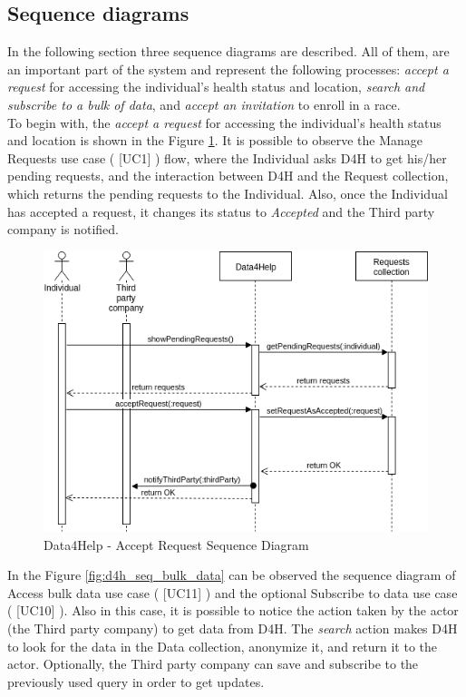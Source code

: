\documentclass[a4paper, hidelinks, 12pt]{report}
\newcommand\usecase[1]{ [UC#1] }
\begin{document}
	\subsection{Sequence diagrams}
	In the following section three sequence diagrams are described. All of them, are an important part of the system and represent the following processes: \textit{accept a request} for accessing the individual's health status and location, \textit{search and subscribe to a bulk of data}, and \textit{accept an invitation} to enroll in a race.\\
	
	To begin with, the \textit{accept a request} for accessing the individual's health status and location is shown in the Figure \ref{fig:d4h_seq_accept_request}. It is possible to observe the Manage Requests use case (\usecase{1}) flow, where the Individual asks D4H to get his/her pending requests, and the interaction between D4H and the Request collection, which returns the pending requests to the Individual. Also, once the Individual has accepted a request, it changes its status to \textit{Accepted} and the Third party company is notified. \\
	
	\begin{figure}[H]
		\centering
		\includegraphics[scale=0.6]{Diagrams/d4h_seq_accept_request.png}
		\caption[Data4Help - Accept Request Sequence Diagram]{Data4Help - Accept Request Sequence Diagram}
		\label{fig:d4h_seq_accept_request}
	\end{figure}
	
	In the Figure \ref{fig:d4h_seq_bulk_data} can be observed the sequence diagram of Access bulk data use case (\usecase{11}) and the optional Subscribe to data use case (\usecase{10}). Also in this case, it is possible to notice the action taken by the actor (the Third party company) to get data from D4H. The \textit{search} action makes D4H to look for the data in the Data collection, anonymize it, and return it to the actor. Optionally, the Third party company can save and subscribe to the previously used query in order to get updates.\\
	
\end{document}
